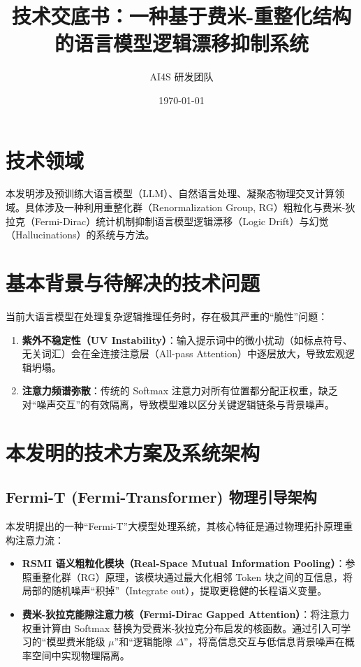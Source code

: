 \documentclass[UTF8, fontset=mac]{ctexart}
\title{\zihao{2}\heiti 技术交底书：一种基于费米-重整化结构的语言模型逻辑漂移抑制系统}
\author{\zihao{4} AI4S 研发团队}
\date{\today}
\begin{document}
\maketitle

\section{技术领域}
本发明涉及预训练大语言模型（LLM）、自然语言处理、凝聚态物理交叉计算领域。具体涉及一种利用重整化群（Renormalization Group, RG）粗粒化与费米-狄拉克（Fermi-Dirac）统计机制抑制语言模型逻辑漂移（Logic Drift）与幻觉（Hallucinations）的系统与方法。

\section{基本背景与待解决的技术问题}
当前大语言模型在处理复杂逻辑推理任务时，存在极其严重的“脆性”问题：
\begin{enumerate}
    \item \textbf{紫外不稳定性（UV Instability）}：输入提示词中的微小扰动（如标点符号、无关词汇）会在全连接注意层（All-pass Attention）中逐层放大，导致宏观逻辑坍塌。
    \item \textbf{注意力频谱弥散}：传统的 Softmax 注意力对所有位置都分配正权重，缺乏对“噪声交互”的有效隔离，导致模型难以区分关键逻辑链条与背景噪声。
\end{enumerate}

\section{本发明的技术方案及系统架构}

\subsection{Fermi-T (Fermi-Transformer) 物理引导架构}
本发明提出的一种“Fermi-T”大模型处理系统，其核心特征是通过物理拓扑原理重构注意力流：
\begin{itemize}
    \item \textbf{RSMI 语义粗粒化模块（Real-Space Mutual Information Pooling）}：参照重整化群（RG）原理，该模块通过最大化相邻 Token 块之间的互信息，将局部的随机噪声“积掉”（Integrate out），提取更稳健的长程语义变量。
    \item \textbf{费米-狄拉克能隙注意力核（Fermi-Dirac Gapped Attention）}：将注意力权重计算由 Softmax 替换为受费米-狄拉克分布启发的核函数。通过引入可学习的“模型费米能级 $\mu$”和“逻辑能隙 $\Delta$”，将高信息交互与低信息背景噪声在概率空间中实现物理隔离。
\end{itemize}
\end{document}

